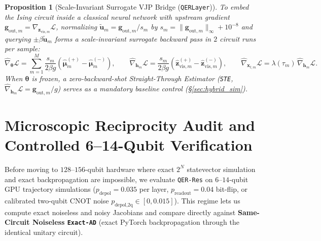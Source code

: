 \documentclass[11pt]{article}
\newtheorem{proposition}{Proposition}
\begin{document}
\begin{proposition}[Scale-Invariant Surrogate VJP Bridge (\texttt{QERLayer})]
\label{prop:vjp}
To embed the Ising circuit inside a classical neural network with upstream gradient $\mathbf{g}_{\text{out},m}=\nabla_{\mathbf{z}_{\text{vis},m}}\mathcal{L}$, normalizing $\tilde{\mathbf{u}}_m=\mathbf{g}_{\text{out},m}/s_m$ by $s_m=\|\mathbf{g}_{\text{out},m}\|_\infty+10^{-8}$ and querying $\pm\beta\tilde{\mathbf{u}}_m$ forms a scale-invariant surrogate backward pass in $2$ circuit runs per sample:
\begin{equation}
  \widehat{\nabla}_{\boldsymbol{\theta}}\mathcal{L} = \sum_{m=1}^M \frac{s_m}{2\beta g}(\hat{\boldsymbol{\mu}}_m^{(+)}-\hat{\boldsymbol{\mu}}_m^{(-)}), \qquad
  \widehat{\nabla}_{\mathbf{h}_m}\mathcal{L} = \frac{s_m}{2\beta g}(\hat{\mathbf{z}}_{\text{vis},m}^{(+)}-\hat{\mathbf{z}}_{\text{vis},m}^{(-)}), \qquad
  \widehat{\nabla}_{\mathbf{x}_{t,m}}\mathcal{L} = \lambda(\tau_m)\,\widehat{\nabla}_{\mathbf{h}_m}\mathcal{L}.
  \label{eq:qerlayer}
\end{equation}
When $\boldsymbol{\theta}$ is frozen, a zero-backward-shot Straight-Through Estimator (\texttt{STE}, $\widehat{\nabla}_{\mathbf{h}_m}\mathcal{L}=\mathbf{g}_{\text{out},m}/g$) serves as a mandatory baseline control (\S\ref{sec:hybrid_sim}).
\end{proposition}

\section{Microscopic Reciprocity Audit and Controlled 6--14-Qubit Verification}
\label{sec:sim_controls}
Before moving to $128$--$156$-qubit hardware where exact $2^N$ statevector simulation and exact backpropagation are impossible, we evaluate \texttt{QER-Res} on $6$--$14$-qubit GPU trajectory simulations ($p_{\text{depol}}{=}0.035$ per layer, $p_{\text{readout}}{=}0.04$ bit-flip, or calibrated two-qubit CNOT noise $p_{\text{depol,2q}}\in[0,0.015]$). This regime lets us compute exact noiseless and noisy Jacobians and compare directly against \textbf{Same-Circuit Noiseless \texttt{Exact-AD}} (exact PyTorch backpropagation through the identical unitary circuit).
\end{document}
